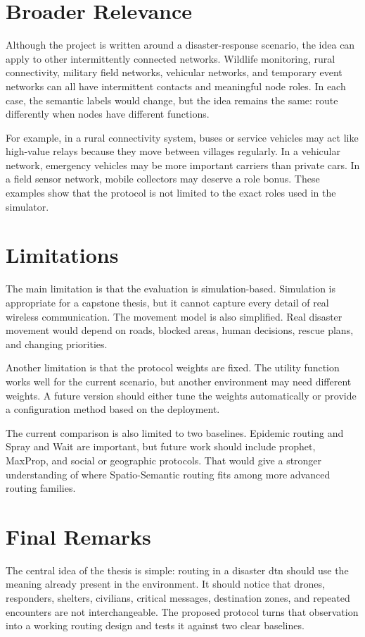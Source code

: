 \section{Broader Relevance}
Although the project is written around a disaster-response scenario, the idea can apply to other intermittently connected networks. Wildlife monitoring, rural connectivity, military field networks, vehicular networks, and temporary event networks can all have intermittent contacts and meaningful node roles. In each case, the semantic labels would change, but the idea remains the same: route differently when nodes have different functions.

For example, in a rural connectivity system, buses or service vehicles may act like high-value relays because they move between villages regularly. In a vehicular network, emergency vehicles may be more important carriers than private cars. In a field sensor network, mobile collectors may deserve a role bonus. These examples show that the protocol is not limited to the exact roles used in the simulator.

\section{Limitations}
The main limitation is that the evaluation is simulation-based. Simulation is appropriate for a capstone thesis, but it cannot capture every detail of real wireless communication. The movement model is also simplified. Real disaster movement would depend on roads, blocked areas, human decisions, rescue plans, and changing priorities.

Another limitation is that the protocol weights are fixed. The utility function works well for the current scenario, but another environment may need different weights. A future version should either tune the weights automatically or provide a configuration method based on the deployment.

The current comparison is also limited to two baselines. Epidemic routing and Spray and Wait are important, but future work should include \ac{prophet}, MaxProp, and social or geographic protocols. That would give a stronger understanding of where Spatio-Semantic routing fits among more advanced routing families.

\section{Final Remarks}
The central idea of the thesis is simple: routing in a disaster \ac{dtn} should use the meaning already present in the environment. It should notice that drones, responders, shelters, civilians, critical messages, destination zones, and repeated encounters are not interchangeable. The proposed protocol turns that observation into a working routing design and tests it against two clear baselines.

